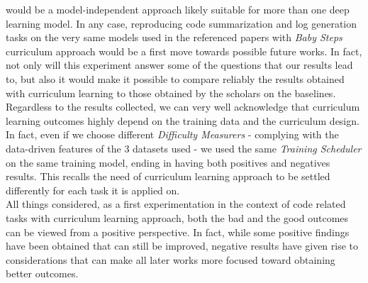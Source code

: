 would be a model-independent approach likely suitable for more than one deep learning model.
In any case, reproducing code summarization and log generation tasks on the very same models used in the referenced papers with
\textit{Baby Steps} curriculum approach would be a first move towards possible future works. In fact, not only will this experiment answer 
some of the questions that our results lead to, but also it would make it possible to compare reliably the results obtained with curriculum 
learning to those obtained by the scholars on the baselines.\\
Regardless to the results collected, we can very well acknowledge that curriculum learning outcomes highly depend on the training data 
and the curriculum design. In fact, even if we choose different \textit{Difficulty Measurers} - 
complying with the data-driven features of the 3 datasets used - we used the same \textit{Training Scheduler} on the same training model, ending in having both positives and negatives results.
This recalls the need of curriculum learning approach to be settled differently for each task it is applied on.\\
All things considered, as a first experimentation in the context of code related tasks with curriculum learning approach, both the bad and the good
outcomes can be viewed from a positive perspective. In fact, while some positive findings have been obtained that can still be improved,
negative results have given rise to considerations that can make all later works more focused toward obtaining better outcomes.



